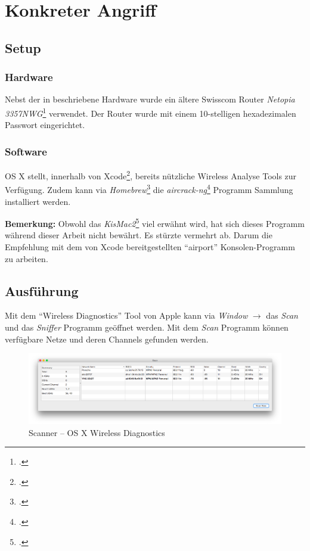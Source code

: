 \section{Konkreter Angriff}
\label{sec:wepAttack}

\subsection{Setup}
\subsubsection{Hardware}
Nebst der in  beschriebene Hardware wurde ein ältere Swisscom Router \textit{Netopia  3357NWG}\footcite{Netopia_3347_57nwg_de_2015-04-06} verwendet. Der Router wurde mit einem 10-stelligen hexadezimalen Passwort eingerichtet.

\subsubsection{Software}
OS X stellt, innerhalb von Xcode\footcite{Xcode_Apple_Developer_2015-04-06}, bereits nützliche Wireless Analyse Tools zur Verfügung.
Zudem kann via \textit{Homebrew}\footcite{Homebrew__The_missing_package_manager_for_OS_X_2015-04-06} die \textit{aircrack-ng}\footcite{Aircrack-ng_2015-04-06} Programm Sammlung installiert werden.

\begin{framed}
	\textbf{Bemerkung:} Obwohl das \textit{KisMac2}\footcite{IGR_Software_KisMac2_2015-04-06} viel erwähnt wird, hat sich dieses Programm während dieser Arbeit nicht bewährt. Es stürzte vermehrt ab. Darum die Empfehlung mit dem von Xcode bereitgestellten "`airport"' Konsolen-Programm zu arbeiten.
\end{framed}

\subsection{Ausführung}
Mit dem "`Wireless Diagnostics"' Tool von Apple kann via \textit{Window} $\rightarrow$ das \textit{Scan} und das \textit{Sniffer} Programm geöffnet werden.
Mit dem \textit{Scan} Programm können verfügbare Netze und deren Channels gefunden werden.

\begin{figure}[H]
	\centering
	\includegraphics[width=1.0\textwidth]{images/wep/scan.png}
	\caption{Scanner -- OS X Wireless Diagnostics}
\end{figure}

